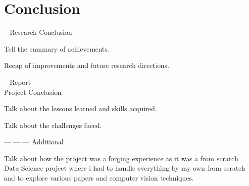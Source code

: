 \section{Conclusion}
-- Research Conclusion

Tell the summary of achievements.

Recap of improvements and future research directions.

-- Report \\ Project Conclusion

Talk about the lessons learned and skills acquired.

Talk about the challenges faced.

--- --- --- Additional

Talk about how the project was a forging experience as it was a from scratch Data Science project where i had to handle everything by my own from scratch and to explore various papers and computer vision techniques.
